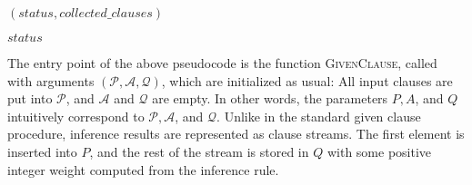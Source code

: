 \begin{algorithmic}[0]
    \State \Return $(\mathit{status}, \mathit{collected\_clauses})$
  \EndFunction

  \vspace{1\jot}


    \Else
      \Else
           
          \EndIf
        \EndFor
         
        \Else{} 
        \EndIf
      \EndIf
    \EndIf
  \EndWhile
  \State \Return $\mathit{status}$

  \EndFunction
\end{algorithmic}
%

The entry point of the above pseudocode is the function \textsc{GivenClause}, called
with arguments $(\mathcal{P}, \mathcal{A}, \mathcal{Q})$, which are initialized
as usual: All input clauses are put into $\mathcal{P}$, and $\mathcal{A}$ and
$\mathcal{Q}$ are empty. In other words, the parameters $P, A$, and $Q$ intuitively
correspond to $\mathcal{P}, \mathcal{A}$, and $\mathcal{Q}$. Unlike in the
standard given clause procedure, inference results are represented as clause
streams. The first element is inserted into $P$, and the rest of the stream is
stored in $Q$ with some positive integer weight computed from the inference
rule.

